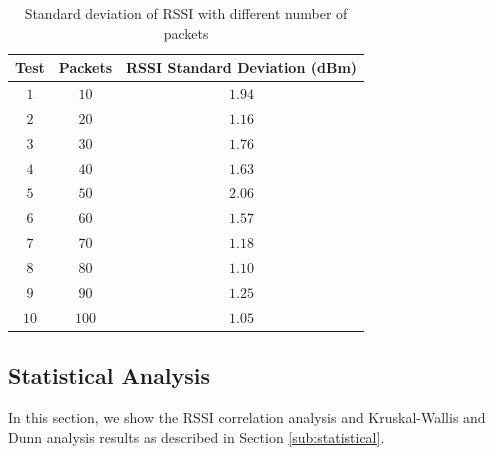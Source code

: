 \begin{table}[h!]
\centering
\caption{Standard deviation of RSSI with different number of packets}
\label{tab:stdmessages}
\begin{tabular}{@{}ccc@{}}
\toprule
\textbf{Test} & \textbf{Packets} & \textbf{RSSI Standard Deviation (dBm)} \\ \midrule
$1$                    & $10$                     & $1.94$                                \\
$2$                    & $20$                     & $1.16$                                \\
$3$                    & $30$                     & $1.76$                                \\
$4$                    & $40$                     & $1.63$                                \\
$5$                    & $50$                     & $2.06$                                \\
$6$                    & $60$                     & $1.57$                                \\
$7$                    & $70$                     & $1.18$                                \\
$8$                    & $80$                     & $1.10$                                \\
$9$                    & $90$                     & $1.25$                                \\
$10$                   & $100$                    & $1.05$                                \\ \bottomrule
\end{tabular}
\end{table}

\subsection{Statistical Analysis}
In this section, we show the RSSI correlation analysis and Kruskal-Wallis and Dunn analysis results as described in Section \ref{sub:statistical}.

